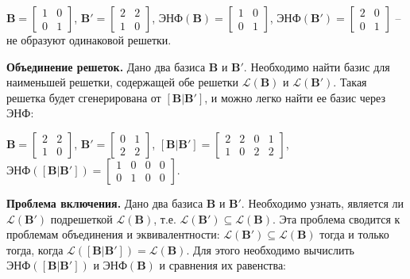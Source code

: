 $ \mathbf{B} = \left[\begin{array}{cccc}
1 & 0 \\
0 & 1
\end{array}\right] $, 
$ \mathbf{B}' = \left[\begin{array}{cccc}
2 & 2 \\
1 & 0
\end{array}\right] $, 
$ \text{ЭНФ}(\mathbf{B}) = \left[\begin{array}{cccc}
1 & 0 \\
0 & 1
\end{array}\right] $,
$ \text{ЭНФ}(\mathbf{B}') = \left[\begin{array}{cccc}
2 & 0 \\
0 & 1
\end{array}\right] $ -- не образуют одинаковой решетки.

\textbf{Объединение решеток.} Дано два базиса $ \mathbf{B} $ и $ \mathbf{B}' $. Необходимо найти базис для наименьшей решетки, содержащей обе решетки $ \mathcal{L}(\mathbf{B}) $ и $ \mathcal{L}(\mathbf{B}') $. Такая решетка будет сгенерирована от $ \left[\mathbf{B}|\mathbf{B}'\right] $, и можно легко найти ее базис через ЭНФ:

$ \mathbf{B} = \left[\begin{array}{cccc}
2 & 2 \\
1 & 0
\end{array}\right] $, 
$ \mathbf{B}' = \left[\begin{array}{cccc}
0 & 1 \\
2 & 2
\end{array}\right] $, 
$ \left[\mathbf{B} | \mathbf{B}'\right] = \left[\begin{array}{cccc}
2 & 2 & 0 & 1 \\
1 & 0 & 2 & 2
\end{array}\right] $, 
$ \text{ЭНФ}(\left[\mathbf{B} | \mathbf{B}' \right]) = \left[\begin{array}{cccc}
1 & 0 & 0 & 0 \\
0 & 1 & 0 & 0
\end{array}\right] $.

\textbf{Проблема включения.} Дано два базиса $ \mathbf{B} $ и $ \mathbf{B}' $. Необходимо узнать, является ли $ \mathcal{L}(\mathbf{B}') $ подрешеткой $ \mathcal{L}(\mathbf{B}) $, т.е. $ \mathcal{L}(\mathbf{B}') \subseteq \mathcal{L}(\mathbf{B}) $. Эта проблема сводится к проблемам объединения и эквивалентности: $ \mathcal{L}(\mathbf{B}') \subseteq \mathcal{L}(\mathbf{B}) $ тогда и только тогда, когда $ \mathcal{L}(\left[\mathbf{B}|\mathbf{B}'\right]) = \mathcal{L}(\mathbf{B}) $. Для этого необходимо вычислить $ \text{ЭНФ}(\left[\mathbf{B} | \mathbf{B}' \right]) $ и $ \text{ЭНФ}(\mathbf{B}) $ и сравнения их равенства:

